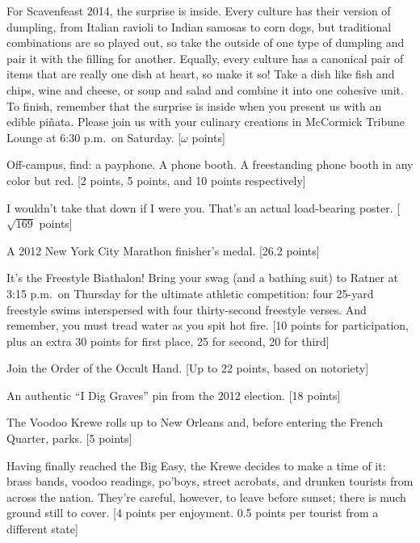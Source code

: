 \documentclass{book}
\begin{document}
\begin{list}{}{}
\item For Scavenfeast 2014, the surprise is inside. Every culture has their version of dumpling, from Italian ravioli to Indian samosas to corn dogs, but traditional combinations are so played out, so take the outside of one type of dumpling and pair it with the filling for another. Equally, every culture has a canonical pair of items that are really one dish at heart, so make it so! Take a dish like fish and chips, wine and cheese, or soup and salad and combine it into one cohesive unit. To finish, remember that the surprise is inside when you present us with an edible pi\~{n}ata. Please join us with your culinary creations in McCormick Tribune Lounge at 6:30 p.m.\ on Saturday. [$\omega$ points]

\item Off-campus, find: a payphone. A phone booth. A freestanding phone booth in any color but red. [2 points, 5 points, and 10 points respectively]

\item I wouldn't take that down if I were you. That's an actual load-bearing poster. [$\sqrt{169}$ points]

\item A 2012 New York City Marathon finisher's medal. [26.2 points]

\item It's the Freestyle Biathalon! Bring your swag (and a bathing suit) to Ratner at 3:15 p.m.\ on Thursday for the ultimate athletic competition: four 25-yard freestyle swims interspersed with four thirty-second freestyle verses. And remember, you must tread water as you spit hot fire. [10 points for participation, plus an extra 30 points for first place, 25 for second, 20 for third]

\item Join the Order of the Occult Hand. [Up to 22 points, based on notoriety] 

\item An authentic ``I Dig Graves'' pin from the 2012 election. [18 points]

\item The Voodoo Krewe rolls up to New Orleans and, before entering the French Quarter, parks. [5 points]

\item Having finally reached the Big Easy, the Krewe decides to make a time of it: brass bands, voodoo readings, po'boys, street acrobats, and drunken tourists from across the nation. They're careful, however, to leave before sunset; there is much ground still to cover. [4 points per enjoyment. 0.5 points per tourist from a different state] 


\end{list}
\end{document}
